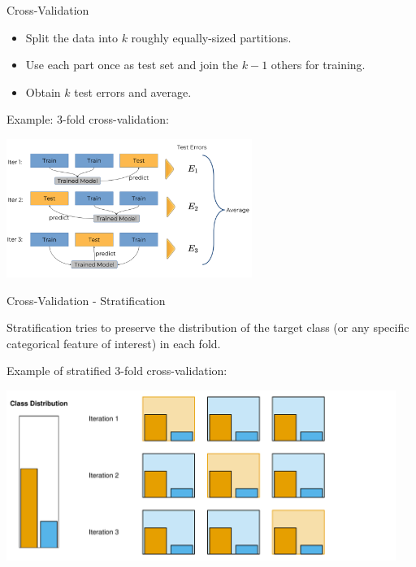 \documentclass[11pt,compress,t,notes=noshow, xcolor=table]{beamer}
\newenvironment{knitrout}{}{} %
\begin{document}
\begin{vbframe}{Cross-Validation}

\begin{itemize}
  \item Split the data into $k$ roughly equally-sized partitions.
  \item Use each part once as test set and join the $k-1$ others for training.
  \item Obtain $k$ test errors and average.
\end{itemize}

\lz

Example: 3-fold cross-validation:

\begin{center}
\includegraphics[width=8cm]{figure_man/crossvalidation.png}
\end{center}
\end{vbframe}

\begin{vbframe}{Cross-Validation - Stratification}

Stratification tries to preserve the distribution of the target class (or any specific categorical feature of interest) in each fold.

\lz

Example of stratified 3-fold cross-validation:

\lz

\begin{knitrout}\scriptsize
{}\color{fgcolor}

{\centering \includegraphics[width=0.95\textwidth]{figure/eval_resample_1} 

}

\end{knitrout}
\end{vbframe}
\end{document}
